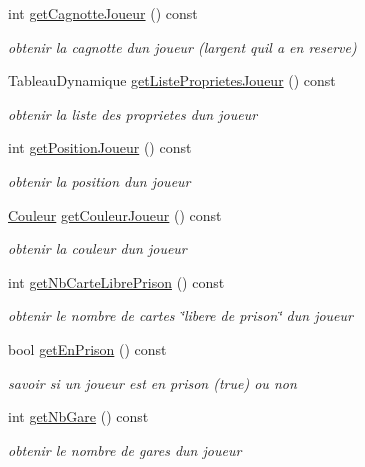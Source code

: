 \begin{DoxyCompactItemize}
int \hyperlink{classJoueur_a4fda33fe1f3ee3c79441db3aa108351a}{get\+Cagnotte\+Joueur} () const 
\begin{DoxyCompactList}\small\item\em obtenir la cagnotte d\textquotesingle{}un joueur (l\textquotesingle{}argent qu\textquotesingle{}il a en reserve) \end{DoxyCompactList}\item 
Tableau\+Dynamique \hyperlink{classJoueur_a2526f4cea8724f3ea6b6433a7c5d6737}{get\+Liste\+Proprietes\+Joueur} () const 
\begin{DoxyCompactList}\small\item\em obtenir la liste des proprietes d\textquotesingle{}un joueur \end{DoxyCompactList}\item 
int \hyperlink{classJoueur_aba03f85caafa2ab3ce52d3769845c972}{get\+Position\+Joueur} () const 
\begin{DoxyCompactList}\small\item\em obtenir la position d\textquotesingle{}un joueur \end{DoxyCompactList}\item 
\hyperlink{classCouleur}{Couleur} \hyperlink{classJoueur_abfac9cbad12a4bb882156e75dbbad07f}{get\+Couleur\+Joueur} () const 
\begin{DoxyCompactList}\small\item\em obtenir la couleur d\textquotesingle{}un joueur \end{DoxyCompactList}\item 
int \hyperlink{classJoueur_a9e1ae8232cf4d458c81bcde1cf6cac9d}{get\+Nb\+Carte\+Libre\+Prison} () const 
\begin{DoxyCompactList}\small\item\em obtenir le nombre de cartes \char`\"{}libere de prison\char`\"{} d\textquotesingle{}un joueur \end{DoxyCompactList}\item 
bool \hyperlink{classJoueur_a50562fb939c041ace1822b49cdf5fb1c}{get\+En\+Prison} () const 
\begin{DoxyCompactList}\small\item\em savoir si un joueur est en prison (true) ou non \end{DoxyCompactList}\item 
int \hyperlink{classJoueur_a2875776408bb1a52062ef4403f9ac830}{get\+Nb\+Gare} () const 
\begin{DoxyCompactList}\small\item\em obtenir le nombre de gares d\textquotesingle{}un joueur \end{DoxyCompactList}\item 

\end{DoxyCompactItemize}
